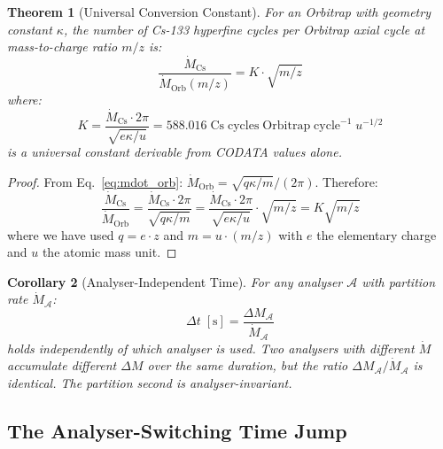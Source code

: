 \documentclass[11pt,twocolumn,a4paper]{article}
\theoremstyle{plain}
\newtheorem{theorem}{Theorem}[section]
\newtheorem{corollary}[theorem]{Corollary}
\theoremstyle{definition}
\theoremstyle{remark}
\begin{document}
\begin{theorem}[Universal Conversion Constant]
\label{thm:K}
For an Orbitrap with geometry constant $\kappa$, the number of Cs-133 hyperfine
cycles per Orbitrap axial cycle at mass-to-charge ratio $m/z$ is:
\begin{equation}
    \frac{\dot{M}_{\mathrm{Cs}}}{\dot{M}_{\mathrm{Orb}}(m/z)} = K \cdot
    \sqrt{m/z}
    \label{eq:K_conversion}
\end{equation}
where:
\begin{equation}
    K = \frac{\dot{M}_{\mathrm{Cs}} \cdot 2\pi}{\sqrt{e\kappa/u}}
    = 588.016 \;\mathrm{Cs\;cycles\;Orbitrap\;cycle}^{-1}\;u^{-1/2}
    \label{eq:K_value}
\end{equation}
is a universal constant derivable from CODATA values alone.
\end{theorem}

\begin{proof}
From Eq.~\eqref{eq:mdot_orb}: $\dot{M}_{\mathrm{Orb}} = \sqrt{q\kappa/m}/(2\pi)$.
Therefore:
\begin{equation}
    \frac{\dot{M}_{\mathrm{Cs}}}{\dot{M}_{\mathrm{Orb}}} =
    \frac{\dot{M}_{\mathrm{Cs}} \cdot 2\pi}{\sqrt{q\kappa/m}} =
    \frac{\dot{M}_{\mathrm{Cs}} \cdot 2\pi}{\sqrt{e\kappa/u}} \cdot \sqrt{m/z}
    = K\sqrt{m/z}
\end{equation}
where we have used $q = e \cdot z$ and $m = u \cdot (m/z)$ with $e$ the
elementary charge and $u$ the atomic mass unit.
\end{proof}

\begin{corollary}[Analyser-Independent Time]
\label{cor:analyser_independent}
For any analyser $\mathcal{A}$ with partition rate $\dot{M}_{\mathcal{A}}$:
\begin{equation}
    \Delta t \;[\mathrm{s}] = \frac{\Delta M_{\mathcal{A}}}{\dot{M}_{\mathcal{A}}}
    \label{eq:analyser_independent}
\end{equation}
holds independently of which analyser is used. Two analysers with different
$\dot{M}$ accumulate different $\Delta M$ over the same duration, but the ratio
$\Delta M_{\mathcal{A}}/\dot{M}_{\mathcal{A}}$ is identical. The partition
second is analyser-invariant.
\end{corollary}

\subsection{The Analyser-Switching Time Jump}
\label{subsec:time_jump}
\end{document}

